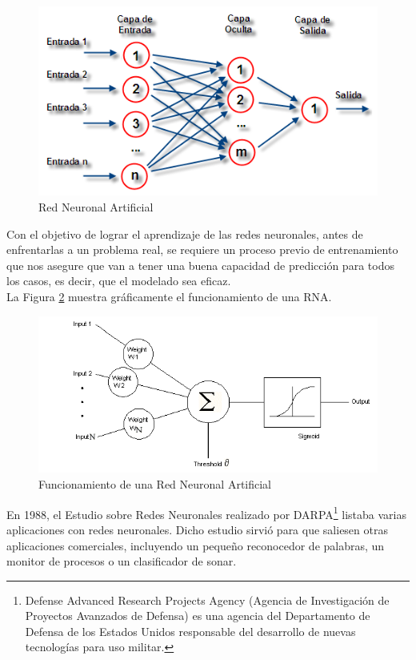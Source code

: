 		\begin{figure}[h]
			\centering
			\includegraphics[scale=1]{img/rna.png}
			\caption{Red Neuronal Artificial}
			\label{fig:rna}
		\end{figure}

		Con el objetivo de lograr el aprendizaje de las redes neuronales, antes de enfrentarlas a un problema real, se requiere un proceso previo de entrenamiento que nos asegure que van a tener una buena capacidad de predicción para todos los casos, es decir, que el modelado sea eficaz.\\
		
		La Figura \ref{fig:func_rna} muestra gráficamente el funcionamiento de una RNA.\\
		
		\begin{figure}[h]
			\centering
			\includegraphics[scale=0.5]{img/rna_pesos.png}
			\caption{Funcionamiento de una Red Neuronal Artificial}
			\label{fig:func_rna}
		\end{figure}
		
		En 1988, el Estudio sobre Redes Neuronales realizado por DARPA\footnote{Defense Advanced Research Projects Agency (Agencia de Investigación de Proyectos Avanzados de Defensa) es una agencia del Departamento de Defensa de los Estados Unidos responsable del desarrollo de nuevas tecnologías para uso militar.} listaba varias aplicaciones con redes neuronales. Dicho estudio sirvió para que saliesen otras aplicaciones comerciales, incluyendo un pequeño reconocedor de palabras, un monitor de procesos o un clasificador de sonar.\\
		
